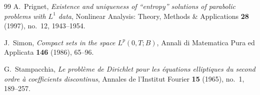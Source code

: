 \documentclass{amsart}
\numberwithin{equation}{section}
\begin{document}
\begin{thebibliography}{99}
A.~Prignet, \emph{Existence and uniqueness of ``entropy'' solutions of parabolic problems with $L^1$ data}, Nonlinear Analysis: Theory, Methods \& Applications \textbf{28} (1997), no.~12, 1943--1954.

J.~Simon, \emph{Compact sets in the space $L^p(0,T; B)$}, Annali di Matematica Pura ed Applicata \textbf{146} (1986), 65--96.

G.~Stampacchia, \emph{Le probl\`eme de Dirichlet pour les \'equations elliptiques du second ordre \`a coefficients discontinus}, Annales de l'Institut Fourier \textbf{15} (1965), no.~1, 189--257.



\end{thebibliography}
\end{document}
